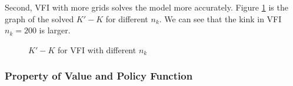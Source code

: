 \documentclass{article}
\begin{document}
	Second, VFI with more grids solves the model more accurately.
	Figure \ref{fig:nk} is the graph of the solved $K'-K$ for different $n_k$.
	We can see that the kink in VFI $n_k=200$ is larger.
	\begin{figure}[H]
		\centering
		\caption{$K'-K$ for VFI with different $n_k$}
		\label{fig:nk}
	\end{figure}
	
	\subsubsection{Property of Value and Policy Function}
	
\end{document}

